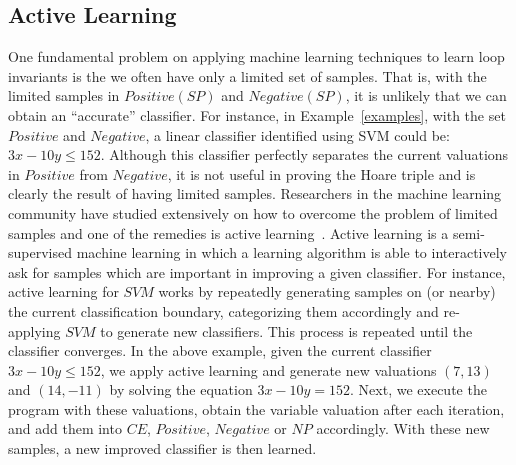 \subsection{Active Learning}
One fundamental problem on applying machine learning techniques to learn loop invariants is the we often have only a limited set of samples. That is, with the limited samples in $Positive(SP)$ and $Negative(SP)$,
it is unlikely that we can obtain an ``accurate'' classifier. For instance, in Example~\ref{examples}, with the set $Positive$ and $Negative$, a linear classifier identified using SVM could be: $3x-10y \leq 152$. %
Although this classifier perfectly separates the current valuations in $Positive$ from $Negative$,
it is not useful in proving the Hoare triple and is clearly the result of having limited samples.
Researchers in the machine learning community have studied extensively on how to overcome the problem of limited samples and one of the remedies is active learning~\cite{DBLP:series/synthesis/2012Settles}.
Active learning is a semi-supervised machine learning in which a learning algorithm is able to interactively ask for samples which are important in improving a given classifier.
For instance, active learning for $SVM$ works by repeatedly generating samples on (or nearby) the current classification boundary,
categorizing them accordingly and re-applying $SVM$ to generate new classifiers.
This process is repeated until the classifier converges.
%
In the above example, given the current classifier $3x-10y \leq 152$, we apply active learning
and generate new valuations $(7, 13)$ and $(14, -11)$ %
by solving the equation $3x-10y = 152$. %
Next, we execute the program with these valuations,
obtain the variable valuation after each iteration, and add them into $\mathit{CE}$, $\mathit{Positive}$, $\mathit{Negative}$ or $\mathit{NP}$ accordingly.
With these new samples, a new improved classifier is then learned.

